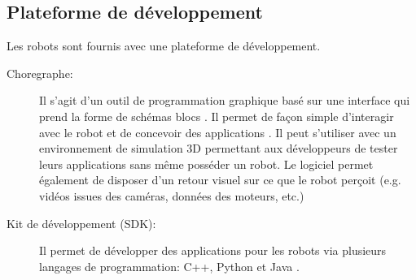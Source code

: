 \subsection{Plateforme de développement}
\label{Entreprise:Les produits: Nao: Plateforme de développement}
Les robots sont fournis avec une plateforme de développement.
\begin{description}
	\item[Choregraphe:] Il s'agit d'un outil de programmation graphique basé sur une interface qui prend la forme de schémas blocs \cite{ChoregrapheTech}. Il permet de façon simple d'interagir avec le robot et de concevoir des applications . Il peut s'utiliser avec un environnement de simulation 3D permettant aux développeurs de tester leurs applications sans même posséder un robot. Le logiciel permet également de disposer d'un retour visuel sur ce que le robot perçoit (e.g. vidéos issues des caméras, données des moteurs, etc.)
	
	\item[Kit de développement (SDK):] Il permet de développer des applications pour les robots via plusieurs langages de programmation:  C++, Python et Java \cite{SDKTech}.
\end{description}

